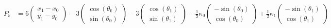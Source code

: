 \documentclass {article}
\begin{document}
\begin {align*}
P_5 &= 6 \left(\begin{array}{c}x_1-x_0\\y_1-y_0\end{array}\right) -3 \left(\begin{array}{c}\cos(\theta_0)\\\sin(\theta_0)\end{array}\right) -3 \left(\begin{array}{c}\cos(\theta_1)\\\sin(\theta_1)\end{array}\right) -\frac{1}{2} \kappa_0\left(\begin{array}{c}-\sin(\theta_0)\\\cos(\theta_0)\end{array}\right) + \frac {1}{2}\kappa_1\left(\begin{array}{c}-\sin(\theta_1)\\\cos(\theta_1)\end{array}\right)
\end {align*}
\end{document}
